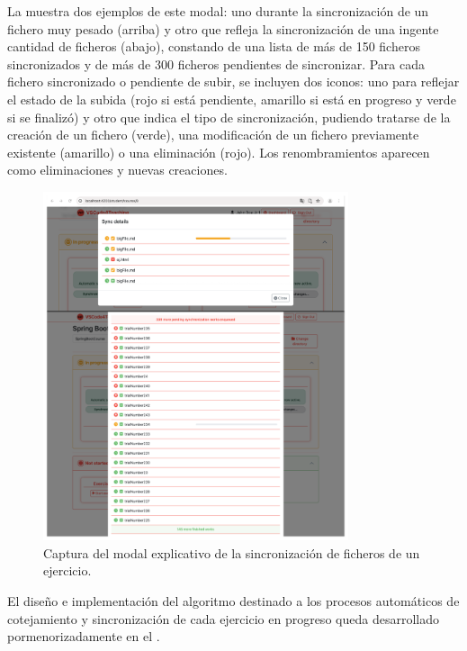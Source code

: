 La  muestra dos ejemplos de este modal: uno durante la sincronización de un fichero muy pesado (arriba) y otro que refleja la sincronización de una ingente cantidad de ficheros (abajo), constando de una lista de más de 150 ficheros sincronizados y de más de 300 ficheros pendientes de sincronizar. Para cada fichero sincronizado o pendiente de subir, se incluyen dos iconos: uno para reflejar el estado de la subida (rojo si está pendiente, amarillo si está en progreso y verde si se finalizó) y otro que indica el tipo de sincronización, pudiendo tratarse de la creación de un fichero (verde), una modificación de un fichero previamente existente (amarillo) o una eliminación (rojo). Los renombramientos aparecen como eliminaciones y nuevas creaciones.

\begin{figure}[ht]
    \centering
    \includegraphics[width=0.8\textwidth]{imagenes/utilizadas/4-3-implementacion/rf11-2.png}
    \caption{Captura del modal explicativo de la sincronización de ficheros de un ejercicio.}
    \label{fig:reqf11-2}
\end{figure}

El diseño e implementación del algoritmo destinado a los procesos automáticos de cotejamiento y sincronización de cada ejercicio en progreso queda desarrollado pormenorizadamente en el .
